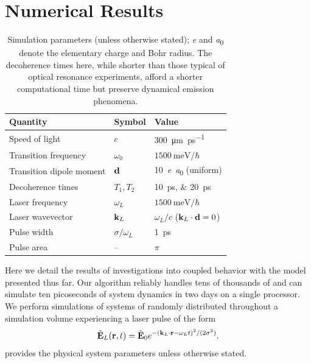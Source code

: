 \section{\label{section:results}Numerical Results}
\begin{table}
  \centering
  \begin{tabular}{lll}
    Quantity                 & Symbol            & Value                        \\ \hline
    Speed of light           & $c$               & \SI{300}{\micro\meter \per \pico\second} \\
    Transition frequency     & $\omega_0$        & $\SI{1500}{\milli\eV}/\hbar$ \\
    Transition dipole moment & $\vb{d}$          & \SI{10}{\elementarycharge\bohr} (uniform) \\
    Decoherence times        & $T_{1}, T_{2}$    & \SIlist{10;20}{\pico\second} \\
    Laser frequency          & $\omega_L$        & $\SI{1500}{\milli\eV}/\hbar$ \\
    Laser wavevector         & $\vb{k}_L$        & $\omega_L/c$ ($\vb{k}_L \cdot \vb{d} = 0$) \\
    Pulse width              & $\sigma/\omega_L$ & \SI{1}{\pico\second} \\
    Pulse area               &  --               & $\pi$ \\
  \end{tabular}
  \caption{\label{table:parameters}Simulation parameters (unless otherwise stated); \si{\elementarycharge} and \si{\bohr} denote the elementary charge and Bohr radius.
    The decoherence times here, while shorter than those typical of optical resonance experiments, afford a shorter computational time but preserve dynamical emission phenomena.
  }
\end{table}

Here we detail the results of investigations into coupled \qd{} behavior with the model presented thus far.
Our algorithm reliably handles tens of thousands of \qds{} and can simulate ten picoseconds of system dynamics in two days on a single processor.
We perform simulations of systems of \qds{} randomly distributed throughout a simulation volume experiencing a laser pulse of the form
\begin{equation}
  \tilde{\mathbf{E}}_L(\vb{r}, t) = \tilde{\mathbf{E}}_0 e^{-(\vb{k}_L \cdot \vb{r} - \omega_L t)^2/(2\sigma^2)}.
  \label{eq:pulse envelope}
\end{equation}
 provides the physical system parameters unless otherwise stated.


